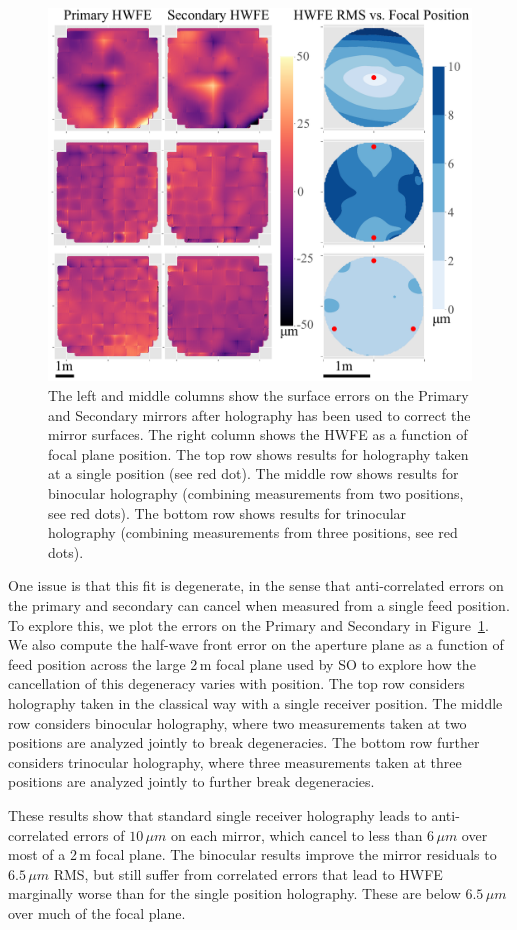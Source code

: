\begin{figure}[t!]
    \centering
    \includegraphics[width=.7\textwidth]{Figures/m1m2_degeneracies-compressed.pdf}
    \caption{The left and middle columns show the surface errors on the Primary and Secondary mirrors after holography has been used to correct the mirror surfaces.  The right column shows the HWFE as a function of focal plane position.  The top row shows results for holography taken at a single position (see red dot).  The middle row shows results for binocular holography (combining measurements from two positions, see red dots).  The bottom row shows results for trinocular holography (combining measurements from three positions, see red dots).}
    \label{fig:m1m2_errs}
\end{figure}

One issue is that this fit is degenerate, in the sense that anti-correlated errors on the primary and secondary can cancel when measured from a single feed position.  To explore this, we plot the errors on the Primary and Secondary in Figure~\ref{fig:m1m2_errs}.  We also compute the half-wave front error on the aperture plane as a function of feed position across the large 2\,m focal plane used by SO to explore how the cancellation of this degeneracy varies with position.  The top row considers holography taken in the classical way with a single receiver position.  The middle row considers binocular holography, where two measurements taken at two positions are analyzed jointly to break degeneracies.  The bottom row further considers trinocular holography, where three measurements taken at three positions are analyzed jointly to further break degeneracies. 

These results show that standard single receiver holography leads to anti-correlated errors of $10\,\mu m$ on each mirror, which cancel to less than $6\,\mu m$ over most of a 2\,m focal plane.  The binocular results improve the mirror residuals to $6.5 \,\mu m$ RMS, but still suffer from correlated errors that lead to HWFE marginally worse than for the single position holography.  These are below  $6.5\,\mu m$ over much of the focal plane.  

